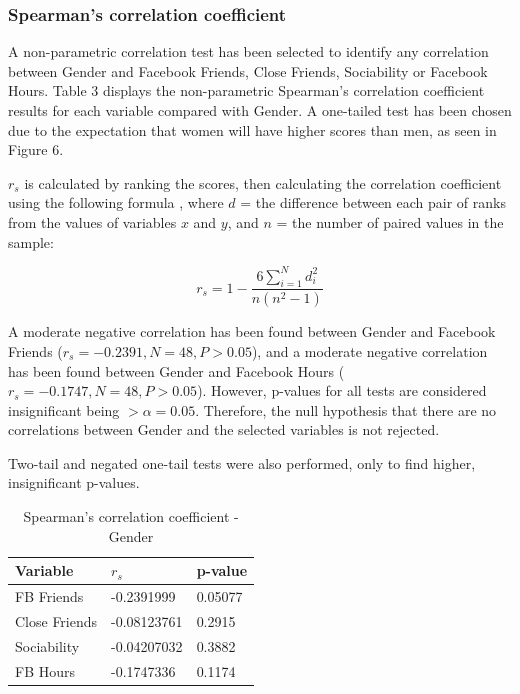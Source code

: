 \subsubsection{Spearman's correlation coefficient}

A non-parametric correlation test has been selected to identify any correlation between Gender and Facebook Friends, Close Friends, Sociability or Facebook Hours. Table 3 displays the non-parametric Spearman's correlation coefficient results for each variable compared with Gender. A one-tailed test has been chosen due to the expectation that women will have higher scores than men, as seen in Figure 6. 

$r_s$ is calculated by ranking the scores, then calculating the correlation coefficient using the following formula \citep[p. 359]{Gauthier2001}, where $d$ = the difference between each pair of ranks from the values of variables $x$ and $y$, and $n$ = the number of paired values in the sample:

$$r_s = 1 - \frac{6\sum_{i=1}^Nd_i^2}{n(n^2-1)}$$\linebreak

A moderate negative correlation has been found between Gender and Facebook Friends ($r_s = -0.2391, N = 48, P > 0.05$), and a moderate negative correlation has been found between Gender and Facebook Hours ($r_s = -0.1747, N = 48, P > 0.05$). However, p-values for all tests are considered insignificant  being $> \alpha = 0.05$. Therefore, the null hypothesis that there are no correlations between Gender and the selected variables is not rejected.



Two-tail and negated one-tail tests were also performed, only to find higher, insignificant p-values.

\begin{table}[H]
\centering
\caption{Spearman's correlation coefficient - Gender}
\begin{tabular}{l|l|l}
Variable      & $r_s$      & p-value \\ \hline
FB Friends    & -0.2391999  & 0.05077 \\ \hline
Close Friends & -0.08123761 & 0.2915  \\ \hline
Sociability   & -0.04207032 & 0.3882  \\ \hline
FB Hours      & -0.1747336  & 0.1174  \\ \hline
\end{tabular}
\end{table}

